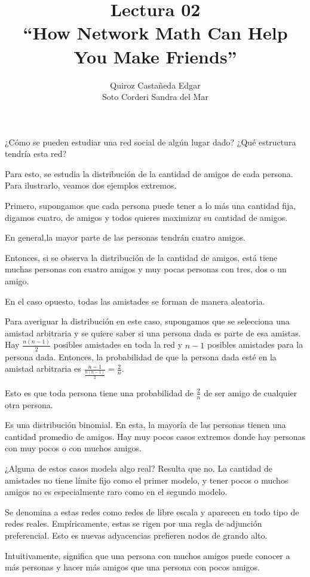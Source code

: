 \documentclass[12pt]{extreport}
\title{
	Lectura 02\\ 
	``How Network Math Can Help You Make Friends''}
\author{
	Quiroz Castañeda Edgar \\
	Soto Corderi Sandra del Mar
	}
\makeatletter
\renewcommand{\maketitle}{
	\bgroup\setlength{\parindent}{0pt}

	\begin{flushright}
		\@author
	\end{flushright}

	\begin{flushleft}
		\textbf{\@title}
	\end{flushleft}

	\egroup
}
\makeatother
\begin{document}
	\maketitle
	
	¿Cómo se pueden estudiar una red social de algún lugar dado? ¿Qué estructura
	tendría esta red?

	Para esto, se estudia la distribución de la cantidad de amigos de cada
	persona. Para ilustrarlo, veamos dos ejemplos extremos.

	Primero, supongamos que cada persona puede tener a lo más una cantidad fija,
	digamos cuatro, de amigos y todos quieres maximizar su cantidad de
	amigos. 

	En general,la mayor parte de las personas tendrán cuatro amigos.

	Entonces, si se observa la distribución de la cantidad de amigos, está tiene
	muchas personas con cuatro amigos y muy pocas personas con tres, dos o un
	amigo.

	En el caso opuesto, todas las amistades se forman de manera aleatoria.

	Para averiguar la distribución en este caso, supongamos que se selecciona 
	una amistad arbitraria y se quiere saber si una persona dada es parte de esa
	amistas. Hay $\frac{n(n-1)}{2}$ posibles amistades en toda la red y $n-1$ 
	posibles amistades para la persona dada. Entonces, la probabilidad de que la
	persona dada esté en la amistad arbitraria es $\frac{n-1}{\frac{n(n-1)}{2}} =
	\frac{2}{n}$.

	Esto es que toda persona tiene una probabilidad de $\frac{2}{n}$ de ser 
	amigo de cualquier otra persona.

	Es una distribución binomial. En esta, la mayoría de las personas tienen una
	cantidad promedio de amigos. Hay muy pocos casos extremos donde hay personas
	con muy pocos o con muchos amigos.
	
	¿Alguna de estos casos modela algo real? Resulta que no. La cantidad de
	amistades no tiene límite fijo como el primer modelo, y tener pocos o muchos
	amigos no es especialmente raro como en el segundo modelo.

	Se denomina a estas redes como redes de libre escala y aparecen en todo tipo 
	de redes reales. Empíricamente, estas se rigen por una regla de adjunción 
	preferencial. Esto es nuevas adyacencias prefieren nodos de grando alto.

	Intuitivamente, significa que una persona con muchos amigos puede conocer a
	más personas y hacer más amigos que una persona con pocos amigos.
\end{document}
